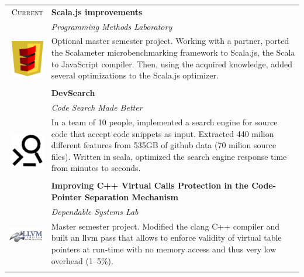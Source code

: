 \documentclass[a4paper,11pt]{article} %
\begin{document}
\begin{tabularx}{\textwidth}{r|X}

\textsc{Current} & \textbf{Scala.js improvements} \\
\multirow{4}{*}{ \includegraphics[width=40pt]{img/scala-js.eps}}
& \emph{Programming Methods Laboratory}\\ 
& \footnotesize{Optional master semester project. Working with a partner, 
 ported the Scalameter microbenchmarking framework to Scala.js, the Scala 
to JavaScript compiler. Then, using the acquired knowledge,
added several optimizations to the Scala.js optimizer.}\\
\multicolumn{2}{c}{} \\

\textsc{Feb.-June 2015} & \textbf{DevSearch} \\
\multirow{4}{*}{ \includegraphics[width=40pt]{img/devsearch.eps}}
& \emph{Code Search Made Better}\\ 
& \footnotesize{In a team of 10 people, implemented a search engine for source code 
that accept code snippets as input. Extracted 440 milion different features from 535GB 
of github data (70 milion source files). Written in scala, optimized the search engine 
response time from minutes to seconds.}\\
\multicolumn{2}{c}{} \\


\textsc{Sept.-Dec. 2014} & \textbf{Improving C++ Virtual Calls Protection in the Code-Pointer Separation Mechanism} \\
\multirow{2}{*}{ \includegraphics[width=60pt]{img/llvm.eps}}
& \emph{Dependable Systems Lab}\\ 
& \footnotesize{Master semester project. Modified the clang C++ compiler and
built an llvm pass that allows to enforce validity of virtual table pointers at
run-time with no memory access and thus very low overhead (1--5\%).}\\
\multicolumn{2}{c}{} \\


\end{tabularx}
\end{document}
